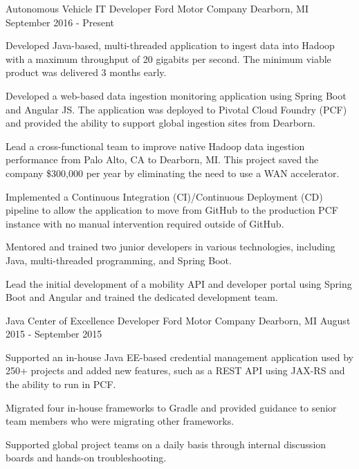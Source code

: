 \documentclass[11pt, a4paper]{awesome-cv}
\begin{document}
\makecvheader[C]

\begin{cventries}
	\cventry
	{Autonomous Vehicle IT Developer}
	{Ford Motor Company}
	{Dearborn, MI}
	{September 2016 - Present}
	{
		\begin{cvitems}
			\item{Developed Java-based, multi-threaded application to ingest data into Hadoop with a maximum throughput of 20 gigabits per second. The minimum viable product was delivered 
				  3 months early.}
			\item{Developed a web-based data ingestion monitoring application using Spring Boot and Angular JS. The application was deployed to Pivotal Cloud Foundry (PCF) and provided the 
				  ability to support global ingestion sites from Dearborn.}
			\item{Lead a cross-functional team to improve native Hadoop data ingestion performance from Palo Alto, CA to Dearborn, MI. This project saved the company \$300,000 per year by 
				  eliminating the need to use a WAN accelerator.}
			\item{Implemented a Continuous Integration (CI)/Continuous Deployment (CD) pipeline to allow the application to move from GitHub to the production PCF instance with no manual 
				  intervention required outside of GitHub.}
			\item{Mentored and trained two junior developers in various technologies, including Java, multi-threaded programming, and Spring Boot.}
			\item{Lead the initial development of a mobility API and developer portal using Spring Boot and Angular and trained the dedicated development team.}
		\end{cvitems}
	}
	
	\cventry
	{Java Center of Excellence Developer}
	{Ford Motor Company}
	{Dearborn, MI}
	{August 2015 - September 2015}
	{
		\begin{cvitems}
			\item{Supported an in-house Java EE-based credential management application used by 250+ projects and added new features, such as a REST API using JAX-RS and the ability to run 
				  in PCF.}
			\item{Migrated four in-house frameworks to Gradle and provided guidance to senior team members who were migrating other frameworks.}
			\item{Supported global project teams on a daily basis through internal discussion boards and hands-on troubleshooting.}
		\end{cvitems}
	}
	

\end{cventries}
\end{document}

